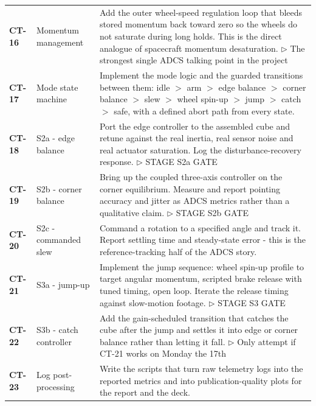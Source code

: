 {\begin{longtable}{@{}L{1.1cm} L{3.0cm} L{11.0cm}@{}}
\textbf{CT-16} & Momentum management & Add the outer wheel-speed regulation loop that bleeds stored momentum back toward zero so the wheels do not saturate during long holds. This is the direct analogue of spacecraft momentum desaturation. \newline\textcolor{p0col}{\footnotesize$\triangleright$ The strongest single ADCS talking point in the project} \\[2pt]
\textbf{CT-17} & Mode state machine & Implement the mode logic and the guarded transitions between them: idle $>$ arm $>$ edge balance $>$ corner balance $>$ slew $>$ wheel spin-up $>$ jump $>$ catch $>$ safe, with a defined abort path from every state. \\[2pt]
\textbf{CT-18} & S2a - edge balance & Port the edge controller to the assembled cube and retune against the real inertia, real sensor noise and real actuator saturation. Log the disturbance-recovery response. \newline\textcolor{p0col}{\footnotesize$\triangleright$ STAGE S2a GATE} \\[2pt]
\textbf{CT-19} & S2b - corner balance & Bring up the coupled three-axis controller on the corner equilibrium. Measure and report pointing accuracy and jitter as ADCS metrics rather than a qualitative claim. \newline\textcolor{p0col}{\footnotesize$\triangleright$ STAGE S2b GATE} \\[2pt]
\textbf{CT-20} & S2c - commanded slew & Command a rotation to a specified angle and track it. Report settling time and steady-state error - this is the reference-tracking half of the ADCS story. \\[2pt]
\textbf{CT-21} & S3a - jump-up & Implement the jump sequence: wheel spin-up profile to target angular momentum, scripted brake release with tuned timing, open loop. Iterate the release timing against slow-motion footage. \newline\textcolor{p0col}{\footnotesize$\triangleright$ STAGE S3 GATE} \\[2pt]
\textbf{CT-22} & S3b - catch controller & Add the gain-scheduled transition that catches the cube after the jump and settles it into edge or corner balance rather than letting it fall. \newline\textcolor{p0col}{\footnotesize$\triangleright$ Only attempt if CT-21 works on Monday the 17th} \\[2pt]
\textbf{CT-23} & Log post-processing & Write the scripts that turn raw telemetry logs into the reported metrics and into publication-quality plots for the report and the deck. \\[2pt]

\end{longtable}}
